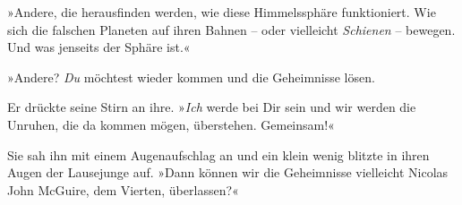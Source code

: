 »Andere, die herausfinden werden, wie diese Himmelssphäre
funktioniert. Wie sich die falschen Planeten auf ihren Bahnen –
oder vielleicht \emph{Schienen} – bewegen. Und was jenseits der
Sphäre ist.«

»Andere? \emph{Du} möchtest wieder kommen und die Geheimnisse
lösen.

\bigpar

Er drückte seine Stirn an ihre. »\emph{Ich} werde bei Dir sein und
wir werden die Unruhen, die da kommen mögen, überstehen.
Gemeinsam!«

\bigpar

Sie sah ihn mit einem Augenaufschlag an und ein klein wenig blitzte
in ihren Augen der Lausejunge auf. »Dann können wir die Geheimnisse
vielleicht Nicolas John McGuire, dem Vierten, überlassen?«



